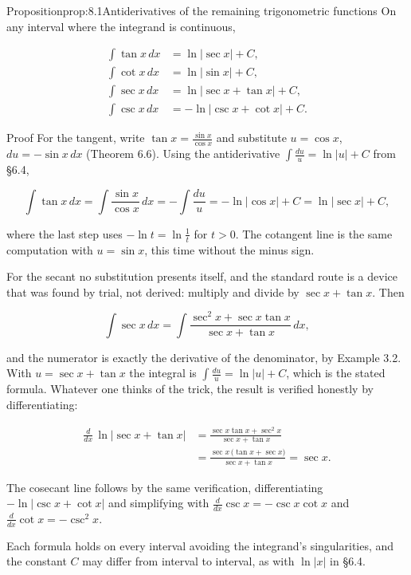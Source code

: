 \documentclass[a4paper,12pt,oneside]{memoir}
\begin{document}
\begin{envproposition}{Proposition}{prop:8.1}{Antiderivatives of the remaining trigonometric functions}
On any interval where the integrand is continuous,

\[ \begin{aligned}
        \int \tan x\,dx &= \ln\lvert\sec x\rvert + C, \\[2pt]
        \int \cot x\,dx &= \ln\lvert\sin x\rvert + C, \\[2pt]
        \int \sec x\,dx &= \ln\lvert\sec x + \tan x\rvert + C, \\[2pt]
        \int \csc x\,dx &= -\ln\lvert\csc x + \cot x\rvert + C.
      \end{aligned} \]
\end{envproposition}
\begin{envproof}{Proof}{}{}
For the tangent, write \(\tan x = \tfrac{\sin x}{\cos x}\) and substitute \(u = \cos x\), \(du = -\sin x\,dx\) (Theorem 6.6). Using the antiderivative \(\int\tfrac{du}{u} = \ln\lvert u\rvert + C\) from §6.4,

\[ \int \tan x\,dx = \int \frac{\sin x}{\cos x}\,dx = -\int \frac{du}{u} = -\ln\lvert\cos x\rvert + C = \ln\lvert\sec x\rvert + C, \]

where the last step uses \(-\ln t = \ln\tfrac{1}{t}\) for \(t > 0\). The cotangent line is the same computation with \(u = \sin x\), this time without the minus sign.

For the secant no substitution presents itself, and the standard route is a device that was found by trial, not derived: multiply and divide by \(\sec x + \tan x\). Then

\[ \int \sec x\,dx = \int \frac{\sec^{2}x + \sec x\tan x}{\sec x + \tan x}\,dx, \]

and the numerator is exactly the derivative of the denominator, by Example 3.2. With \(u = \sec x + \tan x\) the integral is \(\int\tfrac{du}{u} = \ln\lvert u\rvert + C\), which is the stated formula. Whatever one thinks of the trick, the result is verified honestly by differentiating:

\[ \begin{aligned}
        \frac{d}{dx}\,\ln\lvert\sec x + \tan x\rvert &= \frac{\sec x\tan x + \sec^{2}x}{\sec x + \tan x} \\[2pt]
          &= \frac{\sec x\,\bigl(\tan x + \sec x\bigr)}{\sec x + \tan x} = \sec x.
      \end{aligned} \]

The cosecant line follows by the same verification, differentiating \(-\ln\lvert\csc x + \cot x\rvert\) and simplifying with \(\tfrac{d}{dx}\csc x = -\csc x\cot x\) and \(\tfrac{d}{dx}\cot x = -\csc^{2}x\). \qedmark
\end{envproof}
Each formula holds on every interval avoiding the integrand’s singularities, and the constant \(C\) may differ from interval to interval, as with \(\ln\lvert x\rvert\) in §6.4.
\end{document}

